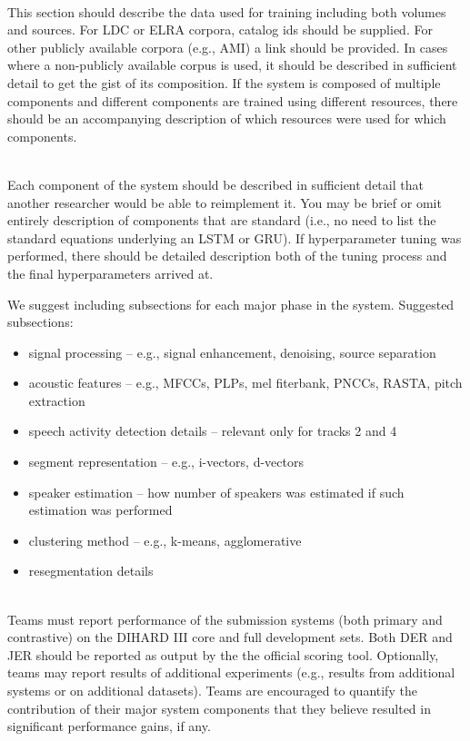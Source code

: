 \documentclass{article}
\begin{document}
\begin{appendices}
\vspace{0.5cm}
 \\
This section should describe the data used for training including both volumes and sources. For LDC or ELRA corpora, catalog ids should be supplied. For other publicly available corpora (e.g., AMI) a link should be provided. In cases where a non-publicly available corpus is used, it should be described in sufficient detail to get the gist of its composition. If the system is composed of multiple components and different components are trained using different resources, there should be an accompanying description of which resources were used for which components.

\vspace{0.5cm}
 \\
Each component of the system should be described in sufficient detail that another researcher would be able to reimplement it. You may be brief or omit entirely description of components that are standard (i.e., no need to list the standard equations underlying an LSTM or GRU). If hyperparameter tuning was performed, there should be detailed description both of the tuning process and the final hyperparameters arrived at.

We suggest including subsections for each major phase in the system. Suggested subsections:
\begin{itemize}
    \item signal processing  --  e.g., signal enhancement, denoising, source separation
    \item acoustic features  --  e.g., MFCCs, PLPs, mel fiterbank, PNCCs, RASTA, pitch extraction
    \item speech activity detection details  --  relevant only for tracks 2 and 4
    \item segment representation  --  e.g., i-vectors, d-vectors
    \item speaker estimation  --  how number of speakers was estimated if such estimation was performed
    \item clustering method  --  e.g., k-means, agglomerative
    \item resegmentation details
\end{itemize}


\vspace{0.5cm}
 \\
Teams must report performance of the submission systems (both primary and contrastive) on the DIHARD III core and full development sets. Both DER and JER should be reported as output by the the official scoring tool. Optionally, teams may report results of additional experiments (e.g., results from additional systems or on additional datasets). Teams are encouraged to quantify the contribution of their major system components that they believe resulted in significant performance gains, if any. 



\end{appendices}
\end{document}
